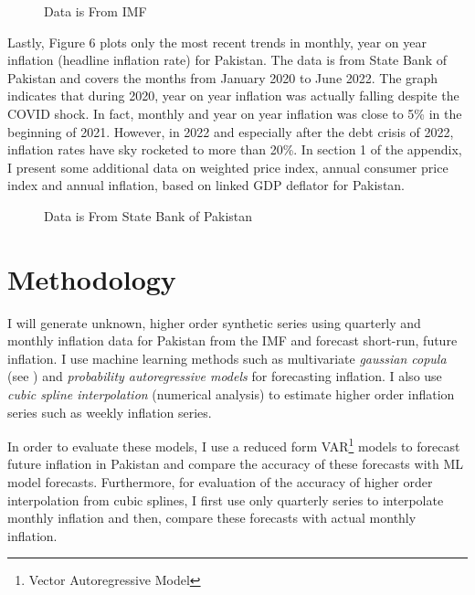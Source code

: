 \documentclass[12pt]{article}
\newcommand{\1}{\mathbbm 1}
\begin{document}
		
		\begin{figure}[H]
			\centering
			\scalebox{0.6}{}
			\hfill
			\caption{Data is From IMF}
		\end{figure}
		
		Lastly, Figure 6 plots only the most recent trends in monthly, year on year inflation (headline inflation rate)  for Pakistan. The data is from State Bank of Pakistan and covers the months from January 2020 to June 2022. The graph indicates that during 2020, year on year inflation was actually falling despite the COVID shock. In fact, monthly and year on year inflation was close to 5\% in the beginning of 2021. However, in 2022 and especially after the debt crisis of 2022, inflation rates have sky rocketed to more than 20\%. In section 1 of the appendix, I present some additional data on weighted price index, annual consumer price index and annual inflation, based on linked GDP deflator for Pakistan.
		
		\begin{figure}[H]
			\centering
			\scalebox{0.8}{}
			\hfill
			\caption{Data is From State Bank of Pakistan}
		\end{figure}
		
		\section{Methodology}
		
		
		
		
		I will generate unknown, higher order synthetic series using quarterly and monthly inflation data for Pakistan from the IMF and forecast short-run, future inflation. I use machine learning methods such as multivariate \textit{gaussian copula} (see \cite{patki2016synthetic}) and \textit{probability autoregressive models} for forecasting inflation. I also use \textit{cubic spline interpolation} (numerical analysis) to estimate higher order inflation series such as weekly inflation series.
		
		In order to evaluate these models, I use a reduced form VAR\footnote{Vector Autoregressive Model} models to forecast future inflation in Pakistan and compare the accuracy of these forecasts with ML model forecasts. Furthermore, for evaluation of the accuracy of higher order interpolation from cubic splines, I first use only quarterly series to interpolate monthly inflation and then, compare these forecasts with actual monthly inflation. 
		
\end{document}
